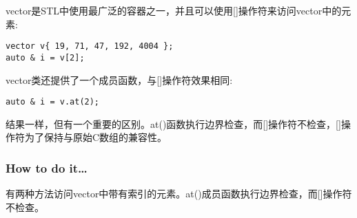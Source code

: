 
vector是STL中使用最广泛的容器之一，并且可以使用[]操作符来访问vector中的元素:

\begin{lstlisting}[style=styleCXX]
vector v{ 19, 71, 47, 192, 4004 };
auto & i = v[2];
\end{lstlisting}

vector类还提供了一个成员函数，与[]操作符效果相同:

\begin{lstlisting}[style=styleCXX]
auto & i = v.at(2);
\end{lstlisting}

结果一样，但有一个重要的区别。at()函数执行边界检查，而[]操作符不检查，[]操作符为了保持与原始C数组的兼容性。

\subsubsection{How to do it…}

有两种方法访问vector中带有索引的元素。at()成员函数执行边界检查，而[]操作符不检查。

